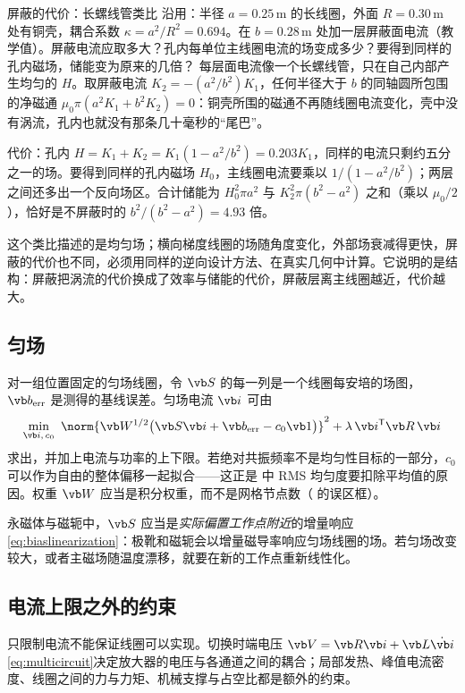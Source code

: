 \begin{example}[label=ex:coils-shield]{屏蔽的代价：长螺线管类比}
沿用：半径 $a=0.25\,\mathrm m$ 的长线圈，外面 $R=0.30\,\mathrm m$ 处有铜壳，耦合系数 $\kappa=a^2/R^2=0.694$。在 $b=0.28\,\mathrm m$ 处加一层屏蔽面电流（教学值）。屏蔽电流应取多大？孔内每单位主线圈电流的场变成多少？要得到同样的孔内磁场，储能变为原来的几倍？
\solution
每层面电流像一个长螺线管，只在自己内部产生均匀的 $H$。取屏蔽电流 $K_2=-(a^2/b^2)K_1$，任何半径大于 $b$ 的同轴圆所包围的净磁通 $\mu_0\pi(a^2K_1+b^2K_2)=0$：铜壳所围的磁通不再随线圈电流变化，壳中没有涡流，孔内也就没有那条几十毫秒的“尾巴”。

代价：孔内 $H=K_1+K_2=K_1(1-a^2/b^2)=0.203K_1$，同样的电流只剩约五分之一的场。要得到同样的孔内磁场 $H_0$，主线圈电流要乘以 $1/(1-a^2/b^2)$；两层之间还多出一个反向场区。合计储能为 $H_0^2\pi a^2$ 与 $K_2^2\pi(b^2-a^2)$ 之和（乘以 $\mu_0/2$），恰好是不屏蔽时的 $b^2/(b^2-a^2)=4.93$ 倍。

这个类比描述的是均匀场；横向梯度线圈的场随角度变化，外部场衰减得更快，屏蔽的代价也不同，必须用同样的逆向设计方法、在真实几何中计算。它说明的是结构：屏蔽把涡流的代价换成了效率与储能的代价，屏蔽层离主线圈越近，代价越大。
\end{example}

\subsection{匀场}
对一组位置固定的匀场线圈，令 $\vb S$ 的每一列是一个线圈每安培的场图，$\vb b_{\rm err}$ 是测得的基线误差。匀场电流 $\vb i$ 可由
\begin{equation}
\min_{\vb i,\,c_0}\ \norm{\vb W^{1/2}\bigl(\vb S\vb i+\vb b_{\rm err}-c_0\vb 1\bigr)}^2+\lambda\,\vb i^{\mathsf T}\vb R\,\vb i
\label{eq:coils-shim}
\end{equation}
求出，并加上电流与功率的上下限。若绝对共振频率不是均匀性目标的一部分，$c_0$ 可以作为自由的整体偏移一起拟合——这正是 中 RMS 均匀度要扣除平均值的原因。权重 $\vb W$ 应当是积分权重，而不是网格节点数（ 的误区框）。

永磁体与磁轭中，$\vb S$ 应当是\emph{实际偏置工作点附近}的增量响应 \eqref{eq:biaslinearization}：极靴和磁轭会以增量磁导率响应匀场线圈的场。若匀场改变较大，或者主磁场随温度漂移，就要在新的工作点重新线性化。

\subsection{电流上限之外的约束}
只限制电流不能保证线圈可以实现。切换时端电压 $\vb V=\vb R\vb i+\vb L\dot{\vb i}$ \eqref{eq:multicircuit}决定放大器的电压与各通道之间的耦合；局部发热、峰值电流密度、线圈之间的力与力矩、机械支撑与占空比都是额外的约束。

